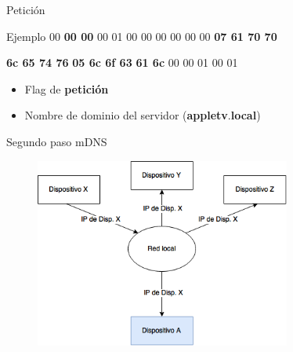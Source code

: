 \begin{frame}{Petición}
	\begin{exampleblock}{Ejemplo}
		 00 \textbf<2>{00 00} 00 01 00 00 \hspace{0.1cm} 00 00 00 00  \textbf<3>{07 61 70 70}

		\textbf<3> {6c 65 74 76} \textbf<4>{05 6c 6f 63} \hspace{0.1cm} \textbf<4>{61 6c} 00 00 01 00 01

	\end{exampleblock}

	\begin{itemize}
		\item<1-> Flag de \textbf<2->{petición}
		\item<1-> Nombre de dominio del servidor (\textbf<3>{appletv}.\textbf<4>{local})
	\end{itemize}
\end{frame}


\begin{frame}{Segundo paso mDNS}
	\begin{figure}[H]
		\centering
		\includegraphics[width=0.75\textwidth]{./Imagenes/mdns2.png}
		\label{fig:mdns2}
	\end{figure}
\end{frame}



